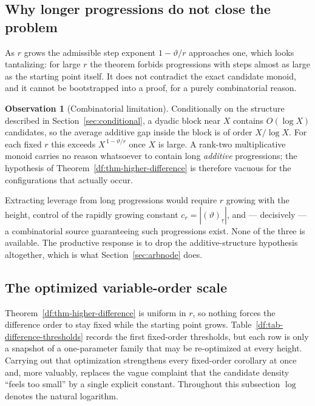 \documentclass[11pt,oneside]{article}
\theoremstyle{definition}
\newtheorem{observation}[theorem]{Observation}
\theoremstyle{remark}
\newcommand{\thetaq}{\vartheta}
\newcommand{\fall}[2]{\left(#1\right)_{\!\underline{#2}}}
\begin{document}
\subsection{Why longer progressions do not close the problem}

As $r$ grows the admissible step exponent $1-\thetaq/r$ approaches one, which looks
tantalizing: for large $r$ the theorem forbids progressions with steps almost as large as the
starting point itself.  It does not contradict the exact candidate monoid, and it cannot be
bootstrapped into a proof, for a purely combinatorial reason.

\begin{observation}[Combinatorial limitation]
\label{df:obs-combinatorial}
Conditionally on the structure described in Section~\ref{sec:conditional}, a dyadic block near
$X$ contains $O(\log X)$ candidates, so the average additive gap inside the block is of order
$X/\log X$.  For each fixed $r$ this exceeds $X^{\,1-\thetaq/r}$ once $X$ is large.  A
rank-two multiplicative monoid carries no reason whatsoever to contain long \emph{additive}
progressions; the hypothesis of Theorem~\ref{df:thm-higher-difference} is therefore vacuous
for the configurations that actually occur.
\end{observation}

Extracting leverage from long progressions would require $r$ growing with the height, control
of the rapidly growing constant $c_r=|\fall{\thetaq}{r}|$, and --- decisively --- a
combinatorial source guaranteeing such progressions exist.  None of the three is available.
The productive response is to drop the additive-structure hypothesis altogether, which is
what Section~\ref{sec:arbnode} does.

\subsection{The optimized variable-order scale}\label{od:optimized}

Theorem~\ref{df:thm-higher-difference} is uniform in $r$, so nothing forces the difference
order to stay fixed while the starting point grows.
Table~\ref{df:tab-difference-thresholds} records the first fixed-order thresholds, but each
row is only a snapshot of a one-parameter family that may be re-optimized at every height.
Carrying out that optimization strengthens every fixed-order corollary at once and, more
valuably, replaces the vague complaint that the candidate density ``feels too small'' by a
single explicit constant.  Throughout this subsection $\log$ denotes the natural logarithm.
\end{document}
